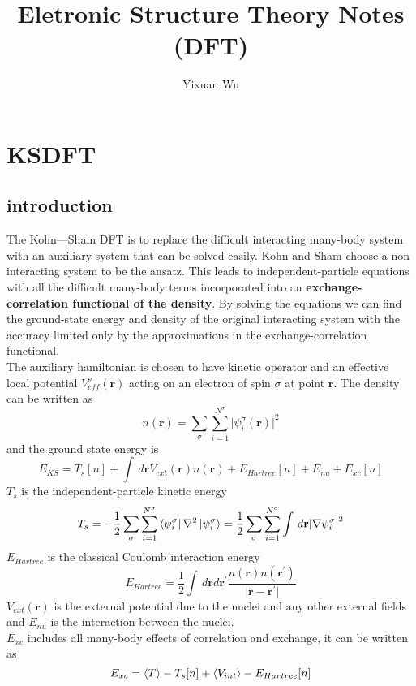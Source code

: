 \documentclass[11pt]{article}
\title{Eletronic Structure Theory Notes (DFT)}
\author{Yixuan Wu}
\begin{document}
\maketitle
\section{KSDFT}
\subsection{introduction}
The Kohn—Sham DFT is to replace the difficult interacting many-body system with an auxiliary system that can be solved
easily. Kohn and Sham choose a non interacting system to be the ansatz. This leads to independent-particle equations with
all the difficult many-body terms incorporated into an \textbf{exchange-correlation functional of the density}. By solving
the equations we can find the ground-state energy and density of the original interacting system with the accuracy limited
only by the approximations in the exchange-correlation functional.\\
The auxiliary hamiltonian is chosen to have kinetic operator and an effective local potential $V_{eff}^\sigma(\mathbf{r})$
acting on an electron of spin $\sigma$ at point $\mathbf{r}$. The density can be written as
\begin{equation}
    n(\mathbf{r})=\sum_{\sigma}\sum_{i=1}^{N^\sigma}{\lvert\psi_i^\sigma(\mathbf{r})\rvert}^2
\end{equation}
and the ground state energy is
\begin{equation}
    E_{KS}=T_s[n]+\int\,d\mathbf{r}V_{ext}(\mathbf{r})n(\mathbf{r})+E_{Hartree}[n]+E_{nu}+E_{xc}[n]
\end{equation}
$T_s$ is the independent-particle kinetic energy
\begin{equation}
    T_s=-\frac{1}{2}\sum_{\sigma}\sum_{i=1}^{N^\sigma}\bra{\psi_i^\sigma}\nabla^2\ket{\psi_i^\sigma}=\frac{1}{2}\sum_{\sigma}\sum_{i=1}^{N^\sigma}\int\,d\mathbf{r}{\lvert\nabla\psi_i^\sigma\rvert}^2
\end{equation}
$E_{Hartree}$ is the classical Coulomb interaction energy
\begin{equation}
    E_{Hartree}=\frac{1}{2}\int\,d\mathbf{r}d\mathbf{r^{'}}\frac{n(\mathbf{r})n(\mathbf{r^{'}})}{\lvert\mathbf{r-r^{'}}\rvert}
\end{equation}
$V_{ext}(\mathbf{r})$ is the external potential due to the nuclei and any other external fields and $E_{nu}$ is the interaction
between the nuclei.\\
$E_{xc}$ includes all many-body effects of correlation and exchange, it can be written as 
\begin{equation}
    E_{xc}=\braket{T}-T_s[n]+\braket{V_{int}}-E_{Hartree}[n]
\end{equation}
\end{document}
